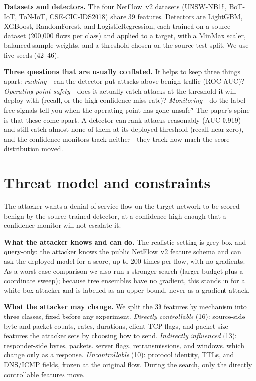 \documentclass[11pt]{article}
\begin{document}
\textbf{Datasets and detectors.} The four NetFlow~v2 datasets (UNSW-NB15, BoT-IoT, ToN-IoT, CSE-CIC-IDS2018) share 39 features. Detectors are LightGBM, XGBoost, RandomForest, and LogisticRegression, each trained on a source dataset (200{,}000 flows per class) and applied to a target, with a MinMax scaler, balanced sample weights, and a threshold chosen on the source test split. We use five seeds (42--46).

\textbf{Three questions that are usually conflated.} It helps to keep three things apart: \emph{ranking}---can the detector put attacks above benign traffic (ROC-AUC)? \emph{Operating-point safety}---does it actually catch attacks at the threshold it will deploy with (recall, or the high-confidence miss rate)? \emph{Monitoring}---do the label-free signals tell you when the operating point has gone unsafe? The paper's spine is that these come apart. A detector can rank attacks reasonably (AUC 0.919) and still catch almost none of them at its deployed threshold (recall near zero), and the confidence monitors track neither---they track how much the score distribution moved.

\section{Threat model and constraints}
The attacker wants a denial-of-service flow on the target network to be scored benign by the source-trained detector, at a confidence high enough that a confidence monitor will not escalate it.

\textbf{What the attacker knows and can do.} The realistic setting is grey-box and query-only: the attacker knows the public NetFlow~v2 feature schema and can ask the deployed model for a score, up to 200 times per flow, with no gradients. As a worst-case comparison we also run a stronger search (larger budget plus a coordinate sweep); because tree ensembles have no gradient, this stands in for a white-box attacker and is labelled as an upper bound, never as a gradient attack.

\textbf{What the attacker may change.} We split the 39 features by mechanism into three classes, fixed before any experiment. \emph{Directly controllable} (16): source-side byte and packet counts, rates, durations, client TCP flags, and packet-size features the attacker sets by choosing how to send. \emph{Indirectly influenced} (13): responder-side bytes, packets, server flags, retransmissions, and windows, which change only as a response. \emph{Uncontrollable} (10): protocol identity, TTLs, and DNS/ICMP fields, frozen at the original flow. During the search, only the directly controllable features move.
\end{document}
